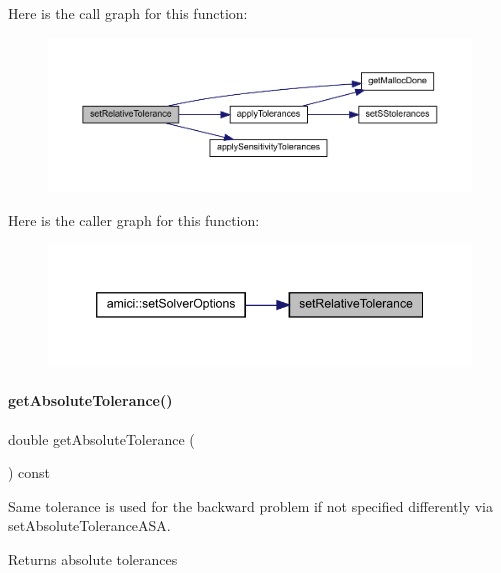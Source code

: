 Here is the call graph for this function\+:
\nopagebreak
\begin{figure}[H]
\begin{center}
\leavevmode
\includegraphics[width=350pt]{classamici_1_1_solver_afb5f0c48f24e4bc3efad8ef599adde56_cgraph}
\end{center}
\end{figure}
Here is the caller graph for this function\+:
\nopagebreak
\begin{figure}[H]
\begin{center}
\leavevmode
\includegraphics[width=346pt]{classamici_1_1_solver_afb5f0c48f24e4bc3efad8ef599adde56_icgraph}
\end{center}
\end{figure}
\mbox{\label{classamici_1_1_solver_a676df944b6737474dd4ef74fe9212f3e}} 
\paragraph{\texorpdfstring{getAbsoluteTolerance()}{getAbsoluteTolerance()}}
{\footnotesize\ttfamily double get\+Absolute\+Tolerance (\begin{DoxyParamCaption}{ }\end{DoxyParamCaption}) const}

Same tolerance is used for the backward problem if not specified differently via set\+Absolute\+Tolerance\+A\+SA.

\begin{DoxyReturn}{Returns}
absolute tolerances 
\end{DoxyReturn}


